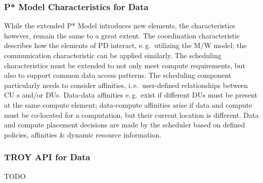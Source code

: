 \documentclass[conference,final]{IEEEtran}
\makeatletter
\def\reduwave{\bgroup \markoverwith{\lower3.5\p@\hbox{\sixly \textcolor{red}{\char58}}}\ULon}
\newcommand{\jwave}[1]{ {\reduwave{#1}}}
\newcommand{\jhanote}[1]{ {\textcolor{red} { ***shantenu: #1 }}}
\newcommand{\alnote}[1]{ {\textcolor{blue} { ***andre: #1 }}}
\newcommand{\jwave}[1]{#1}
\newcommand{\alnote}[1]{}
\newcommand{\jhanote}[1]{}
\newcommand{\cu}{CU\xspace}
\makeatother
\begin{document}


\subsubsection*{P* Model Characteristics for Data}

While the extended P* Model introduces new elements, the
characteristics however, remain the same to a great extent. The
coordination characteristic describes how the elements of PD interact,
e.\,g.\ utilizing the M/W model; the communication characteristic can
be applied similarly. The scheduling characteristics must be extended
to not only meet compute requirements, but also to support common data
access patterns. The scheduling component particularly needs to
consider affinities, i.\,e.\ user-defined relationships between \cu s
and/or DUs. Data-data affinities e.\,g.\ exist if different DUs must
be present at the same compute element; data-compute affinities arise
if data and compute must be co-located for a computation, but their
current location is different. Data and compute placement decisions are
made by the scheduler based on defined policies, affinities \& dynamic
resource information.

\subsubsection*{TROY API for Data}

TODO

% 
% 
\end{document}
